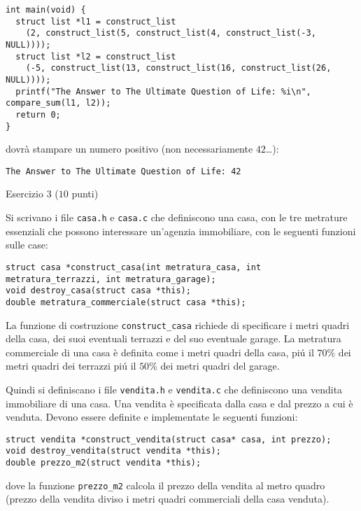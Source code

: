 \documentclass[12pt]{article}
\begin{document}
{\small
\begin{verbatim}
int main(void) {
  struct list *l1 = construct_list
    (2, construct_list(5, construct_list(4, construct_list(-3, NULL))));
  struct list *l2 = construct_list
    (-5, construct_list(13, construct_list(16, construct_list(26, NULL))));
  printf("The Answer to The Ultimate Question of Life: %i\n", compare_sum(l1, l2));
  return 0;
}
\end{verbatim}}

\noindent
dovr\`a stampare un numero positivo (non necessariamente $42$\ldots):
%
{\small
\begin{verbatim}
The Answer to The Ultimate Question of Life: 42
\end{verbatim}}

\vspace*{1ex}
\begin{center}{\Large Esercizio 3} ($10$ punti)\end{center}
%
Si scrivano i file \texttt{casa.h} e \texttt{casa.c} che definiscono una casa, con le tre metrature
essenziali che possono interessare un'agenzia immobiliare, con le seguenti funzioni sulle case:

{\small
\begin{verbatim}
struct casa *construct_casa(int metratura_casa, int metratura_terrazzi, int metratura_garage);
void destroy_casa(struct casa *this);
double metratura_commerciale(struct casa *this);
\end{verbatim}}

\noindent
La funzione di costruzione \texttt{construct\_casa} richiede di specificare i metri quadri della casa,
dei suoi eventuali terrazzi e del suo eventuale garage. La metratura commerciale di una casa \`e
definita come i metri quadri della casa, pi\'u il $70\%$ dei metri quadri dei terrazzi pi\'u il $50\%$
dei metri quadri del garage.

Quindi si definiscano i file \texttt{vendita.h} e \texttt{vendita.c} che definiscono una vendita immobiliare di
una casa. Una vendita \`e specificata dalla casa e dal prezzo a cui \`e venduta. Devono essere definite e implementate
le seguenti funzioni:

{\small
\begin{verbatim}
struct vendita *construct_vendita(struct casa* casa, int prezzo);
void destroy_vendita(struct vendita *this);
double prezzo_m2(struct vendita *this);
\end{verbatim}}

\noindent
dove la funzione \texttt{prezzo\_m2} calcola il prezzo della vendita al metro quadro (prezzo della vendita
diviso i metri quadri commerciali della casa venduta).
\end{document}
